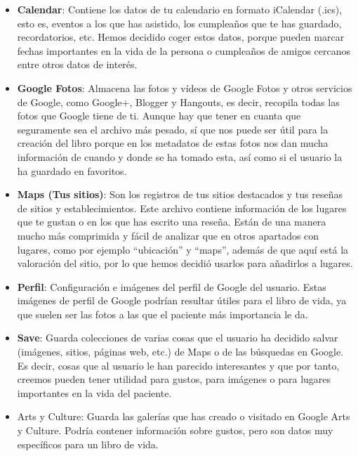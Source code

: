\begin{itemize}
	
	\item \textbf{Calendar}: Contiene los datos de tu calendario en formato iCalendar (.ics), esto es, eventos a los que has asistido, los cumpleaños que te has guardado, recordatorios, etc. Hemos decidido coger estos datos, porque pueden marcar fechas importantes en la vida de la persona o cumpleaños de amigos cercanos entre otros datos de interés.
	
	\item \textbf{Google Fotos}: Almacena las fotos y vídeos de Google Fotos y otros servicios de Google, como Google+, Blogger y Hangouts, es decir, recopila todas las fotos que Google tiene de ti. Aunque hay que tener en cuanta que seguramente sea el archivo más pesado, sí que nos puede ser útil para la creación del libro porque en los metadatos de estas fotos nos dan mucha información de cuando y donde se ha tomado esta, así como si el usuario la ha guardado en favoritos.
	
	\item \textbf{Maps (Tus sitios)}: Son los registros de tus sitios destacados y tus reseñas de sitios y establecimientos. Este archivo contiene información de los lugares que te gustan o en los que has escrito una reseña. Están de una manera mucho más comprimida y fácil de analizar que en otros apartados con lugares, como por ejemplo ``ubicación'' y ``maps'', además de que aquí está la valoración del sitio, por lo que hemos decidió usarlos para añadirlos a lugares.
	
	\item \textbf{Perfil}: Configuración e imágenes del perfil de Google del usuario. Estas imágenes de perfil de Google podrían resultar útiles para el libro de vida, ya que suelen ser las fotos a las que el paciente más importancia le da.
	
	\item \textbf{Save}: Guarda colecciones de varias cosas que el usuario ha decidido salvar (imágenes, sitios, páginas web, etc.) de Maps o de las búsquedas en Google. Es decir, cosas que al usuario le han parecido interesantes y que por tanto, creemos pueden tener utilidad para gustos, para imágenes o para lugares importantes en la vida del paciente.
	
	\item Arts y Culture: Guarda las galerías que has creado o visitado en Google Arts y Culture. Podría contener información sobre gustos, pero son datos muy específicos para un libro de vida.
	

\end{itemize}
